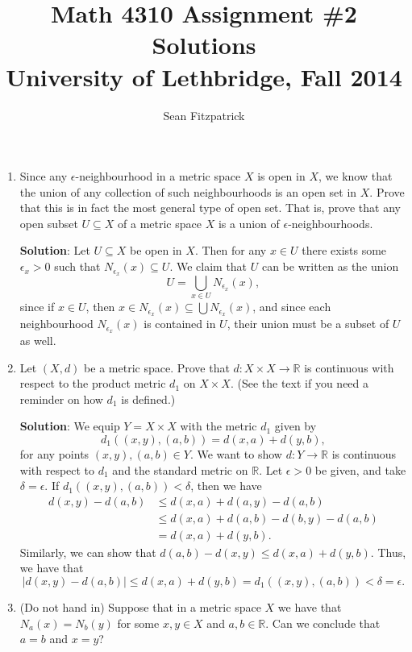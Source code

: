 \documentclass[letterpaper,12pt]{article}
\title{Math 4310 Assignment \#2 Solutions\\University of Lethbridge, Fall 2014}
\author{Sean Fitzpatrick}
\newcommand{\abs}[1]{\lvert #1\rvert}
\newcommand{\R}{\mathbb{R}}
\begin{document}
 \maketitle


\begin{enumerate}
\item Since any $\epsilon$-neighbourhood in a metric space $X$ is open in $X$, we know that the union of any collection of such neighbourhoods is an open set in $X$. Prove that this is in fact the most general type of open set. That is, prove that any open subset $U\subseteq X$ of a metric space $X$ is a union of $\epsilon$-neighbourhoods.

\bigskip

{\bf Solution}: Let $U\subseteq X$ be open in $X$. Then for any $x\in U$ there exists some $\epsilon_x>0$ such that $N_{\epsilon_x}(x)\subseteq U$. We claim that $U$ can be written as the union
\[
 U = \bigcup_{x\in U}N_{\epsilon_x}(x),
\]
since if $x\in U$, then $x\in N_{\epsilon_x}(x)\subseteq \bigcup N_{\epsilon_x}(x)$, and since each neighbourhood $N_{\epsilon_x}(x)$ is contained in $U$, their union must be a subset of $U$ as well.

\item Let $(X,d)$ be a metric space. Prove that $d:X\times X\to \R$ is continuous with respect to the product metric $d_1$ on $X\times X$. (See the text if you need a reminder on how $d_1$ is defined.)

\bigskip

{\bf Solution}: We equip $Y=X\times X$ with the metric $d_1$ given by
\[
 d_1((x,y),(a,b)) = d(x,a)+d(y,b),
\]
for any points $(x,y), (a,b)\in Y$. We want to show $d:Y\to \R$ is continuous with respect to $d_1$ and the standard metric on $\R$. Let $\epsilon>0$ be given, and take $\delta=\epsilon$. If $d_1((x,y),(a,b))<\delta$, then we have
\begin{align*}
 d(x,y)-d(a,b) & \leq d(x,a)+d(a,y)-d(a,b)\\
&\leq d(x,a)+d(a,b)-d(b,y)-d(a,b)\\
& = d(x,a)+d(y,b).
\end{align*}
Similarly, we can show that $d(a,b)-d(x,y)\leq d(x,a)+d(y,b)$. Thus, we have that
\[
 \abs{d(x,y)-d(a,b)}\leq d(x,a)+d(y,b) = d_1((x,y),(a,b)) <\delta=\epsilon.
\]

\item (Do not hand in) Suppose that in a metric space $X$ we have that $N_a(x) = N_b(y)$ for some $x,y\in X$ and $a,b\in\R$. Can we conclude that $a=b$ and $x=y$?


\end{enumerate}
\end{document}
